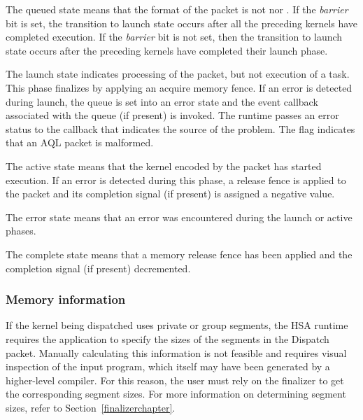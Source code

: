 \documentclass[final]{book}
\newcommand{\reffld}[1]{\textit{#1}}
\begin{document}
\begin{description}[itemsep=1pt,leftmargin=0cm, labelindent=0cm]
\item[Queued] The queued state means that the format of the packet is not
   nor
  .  If the \reffld{barrier} bit is set,
  the transition to launch state occurs after all the preceding kernels have
  completed execution. If the \reffld{barrier} bit is not set, then the
  transition to launch state occurs after the preceding kernels have completed
  their launch phase.

\item[Launch] The launch state indicates processing of the packet, but not
  execution of a task. This phase finalizes by applying an acquire memory fence.
  If an error is detected during launch, the queue is set into an error state
  and the event callback associated with the queue (if present) is invoked. The
  runtime passes an error status to the callback that indicates the source of
  the problem.  The flag 
  indicates that an AQL packet is malformed.

\item[Active] The active state means that the kernel encoded by the packet
  has started execution. If an error is detected during this phase, a release
  fence is applied to the packet and its completion signal (if present) is
  assigned a negative value.

\item[Error] The error state means that an error was encountered during the
  launch or active phases.

\item[Complete] The complete state means that a memory release fence has been
  applied and the completion signal (if present) decremented.
\end{description}

\subsubsection{Memory information}

If the kernel being dispatched uses private or group segments, the HSA runtime
requires the application to specify the sizes of the segments in the Dispatch
packet. Manually calculating this information is not feasible and requires
visual inspection of the input program, which itself may have been generated by
a higher-level compiler. For this reason, the user must rely on the finalizer to
get the corresponding segment sizes. For more information on determining segment
sizes, refer to Section~\ref{finalizerchapter}.
\end{document}
